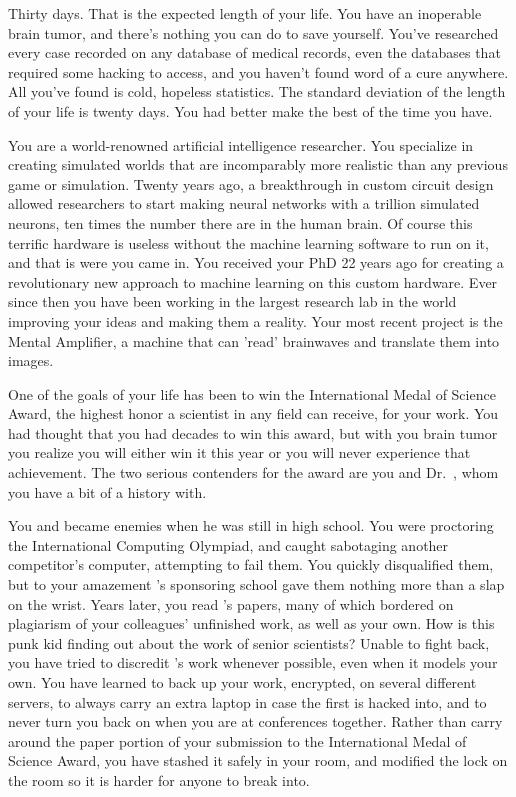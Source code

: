 \documentclass[char]{guildcamp1}
\begin{document}
\name{\cScientist{}}

Thirty days.  That is the expected length of your life.  You have an inoperable brain tumor, and there's nothing you can do to save yourself.  You've researched every case recorded on any database of medical records, even the databases that required some hacking to access, and you haven't found word of a cure anywhere.  All you've found is cold, hopeless statistics.  The standard deviation of the length of your life is twenty days.  You had better make the best of the time you have.

You are a world-renowned artificial intelligence researcher. You specialize in creating simulated worlds that are incomparably more realistic than any previous game or simulation.  Twenty years ago, a breakthrough in custom circuit design allowed researchers to start making neural networks with a trillion simulated neurons, ten times the number there are in the human brain.  Of course this terrific hardware is useless without the machine learning software to run on it, and that is were you came in.  You received your PhD  22 years ago for creating a revolutionary new approach to machine learning on this custom hardware.  Ever since then you have been working in the largest research lab in the world improving your ideas and making them a reality. Your most recent project is the Mental Amplifier, a machine that can 'read' brainwaves and translate them into images.

One of the goals of your life has been to win the International Medal of Science Award, the highest honor a scientist in any field can receive, for your work.  You had thought that you had decades to win this award, but with you brain tumor you realize you will either win it this year or you will never experience that achievement.  The two serious contenders for the award are you and Dr.~\cRival{\intro{}}, whom you have a bit of a history with.  

You and \cRival{} became enemies when he was still in high school.  You were proctoring the International Computing Olympiad, and caught \cRival{} sabotaging another competitor's computer, attempting to fail them. You quickly disqualified them, but to your amazement \cRival{}'s sponsoring school gave them nothing more than a slap on the wrist. Years later, you read \cRival{}'s papers, many of which bordered on plagiarism of your colleagues' unfinished work, as well as your own. How is this punk kid finding out about the work of senior scientists? Unable to fight back, you have tried to discredit \cRival{}'s work whenever possible, even when it models your own. You have learned to back up your work, encrypted, on several different servers, to always carry an extra laptop in case the first is hacked into, and to never turn you back on \cRival{} when you are at conferences together. Rather than carry around the paper portion of your submission to the International Medal of Science Award, you have stashed it safely in your room, and modified the lock on the room so it is harder for anyone to break into.
\end{document}
